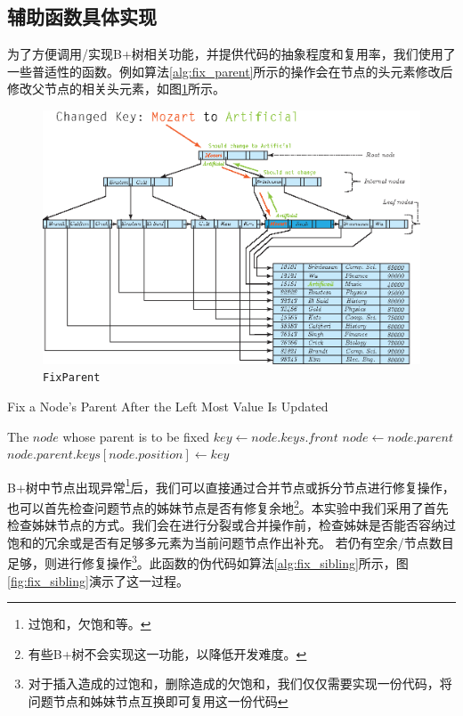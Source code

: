 \documentclass[UTF8]{ctexrep} %
\begin{document}
\subsection{辅助函数具体实现}
为了方便调用/实现B+树相关功能，并提供代码的抽象程度和复用率，我们使用了一些普适性的函数。例如算法\ref{alg:fix_parent}所示的操作会在节点的头元素修改后修改父节点的相关头元素，如图\ref{fig:fix_parent}所示。
\begin{figure}[H]
    \centering
    \includegraphics[width=0.8\linewidth]{figure/fix_parent.eps}
    \caption{\texttt{FixParent}}
    \label{fig:fix_parent}
\end{figure}
\begin{algorithm}[H]
    \caption{Fix a Node's Parent After the Left Most Value Is Updated}
    \label{alg:fix_parent}
    \begin{algorithmic}[1]
        \Require The $node$ whose parent is to be fixed
            \State $key \leftarrow node.keys.front$
             
                \State $node \leftarrow node.parent$
            \EndWhile
                \State $node.parent.keys[node.position] \leftarrow key$
            \EndIf
        \EndFunction
    \end{algorithmic}
\end{algorithm}

B+树中节点出现异常\footnote{过饱和，欠饱和等。}后，我们可以直接通过合并节点或拆分节点进行修复操作，也可以首先检查问题节点的姊妹节点是否有修复余地\footnote{有些B+树不会实现这一功能，以降低开发难度。}。本实验中我们采用了首先检查姊妹节点的方式。我们会在进行分裂或合并操作前，检查姊妹是否能否容纳过饱和的冗余或是否有足够多元素为当前问题节点作出补充。
若仍有空余/节点数目足够，则进行修复操作\footnote{对于插入造成的过饱和，删除造成的欠饱和，我们仅仅需要实现一份代码，将问题节点和姊妹节点互换即可复用这一份代码}。此函数的伪代码如算法\ref{alg:fix_sibling}所示，图\ref{fig:fix_sibling}演示了这一过程。
\end{document}
